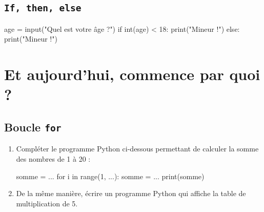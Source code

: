 \documentclass[12pt,a4paper, oneside]{article}
\begin{document}
   \subsection{\texttt{If, then, else}}
   \begin{minipage}{.4\textwidth}
    \begin{pyverbatim}
      age = input("Quel est votre âge ?")
      if int(age) < 18:
        print("Mineur !")
      else:
        print("Mineur !")
    \end{pyverbatim}
   \end{minipage}
   \hfill\begin{minipage}{.4\textwidth}
     \begin{center}
       \begin{scratch}[scale=.8]
       \end{scratch}
     \end{center}
   \end{minipage}

\section{Et aujourd'hui, commence par quoi ?} \label{sec:et-aujourd'hui-on-fait-quoi-?}
   \subsection{Boucle \texttt{for}}\label{subsec:boucle-texttt-for}
   \begin{enumerate}
      \item Compléter le programme Python ci-dessous permettant de calculer la somme des nombres de 1 à 20 :
         \begin{pyverbatim}
           somme = ...
           for i in range(1, ...):
             somme = ...
           print(somme)
        \end{pyverbatim}
      \item De la même manière, écrire un programme Python qui affiche la table de multiplication de 5.
   \end{enumerate}
\end{document}
